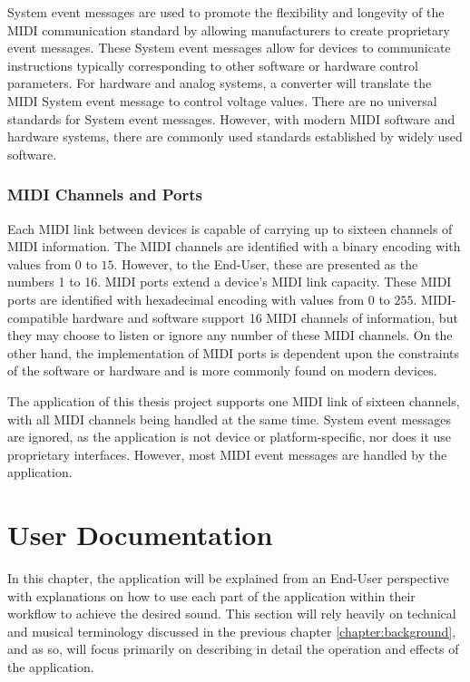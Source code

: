 \documentclass[a4paper,12pt]{report}
\begin{document}
System event messages are used to promote the flexibility and longevity of the MIDI communication standard by allowing manufacturers to create proprietary event messages. These System event messages allow for devices to communicate instructions typically corresponding to other software or hardware control parameters. For hardware and analog systems, a converter will translate the MIDI System event message to control voltage values. There are no universal standards for System event messages. However, with modern MIDI software and hardware systems, there are commonly used standards established by widely used software.

\subsection{MIDI Channels and Ports}
\label{subsec:midichannelports}
Each MIDI link between devices is capable of carrying up to sixteen channels of MIDI information. The MIDI channels are identified with a binary encoding with values from $0$ to $15$. However, to the End-User, these are presented as the numbers 1 to 16. MIDI ports extend a device's MIDI link capacity. These MIDI ports are identified with hexadecimal encoding with values from $0$ to $255$. MIDI-compatible hardware and software support 16 MIDI channels of information, but they may choose to listen or ignore any number of these MIDI channels. On the other hand, the implementation of MIDI ports is dependent upon the constraints of the software or hardware and is more commonly found on modern devices.

The application of this thesis project supports one MIDI link of sixteen channels, with all MIDI channels being handled at the same time. System event messages are ignored, as the application is not device or platform-specific, nor does it use proprietary interfaces. However, most MIDI event messages are handled by the application.


\chapter{User Documentation}
\label{chapter:userdoc}
In this chapter, the application will be explained from an End-User perspective with explanations on how to use each part of the application within their workflow to achieve the desired sound. This section will rely heavily on technical and musical terminology discussed in the previous chapter \ref{chapter:background}, and as so, will focus primarily on describing in detail the operation and effects of the application.
\end{document}
